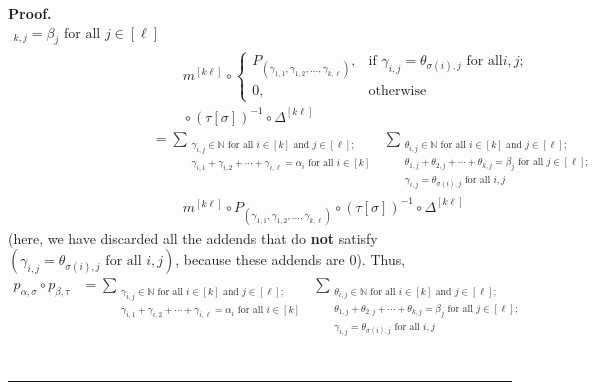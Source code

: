 \documentclass[numbers=enddot,12pt,final,onecolumn,notitlepage]{scrartcl}%
\theoremstyle{definition}
\newenvironment{proof}[1][Proof]{\noindent\textbf{#1.} }{\ \rule{0.5em}{0.5em}}
\let\sumnonlimits\sum
\renewcommand{\sum}{\sumnonlimits\limits}
\begin{document}
\begin{proof}
\begin{align*}
{{_{k,j}=\beta_{j}\text{ for all }j\in\left[  \ell\right]  }}\\
&  \ \ \ \ \ \ \ \ \ \ m^{\left[  k\ell\right]  }\circ%
\begin{cases}
P_{\left(  \gamma_{1,1},\gamma_{1,2},\ldots,\gamma_{k,\ell}\right)  }, &
\text{if }\gamma_{i,j}=\theta_{\sigma\left(  i\right)  ,j}\text{ for all
}i,j;\\
0, & \text{otherwise}%
\end{cases}
\\
&  \ \ \ \ \ \ \ \ \ \ \circ\left(  \tau\left[  \sigma\right]  \right)
^{-1}\circ\Delta^{\left[  k\ell\right]  }\\
&  =\sum_{\substack{\gamma_{i,j}\in\mathbb{N}\text{ for all }i\in\left[
k\right]  \text{ and }j\in\left[  \ell\right]  ;\\\gamma_{i,1}+\gamma
_{i,2}+\cdots+\gamma_{i,\ell}=\alpha_{i}\text{ for all }i\in\left[  k\right]
}}\ \ \sum_{\substack{\theta_{i,j}\in\mathbb{N}\text{ for all }i\in\left[
k\right]  \text{ and }j\in\left[  \ell\right]  ;\\\theta_{1,j}+\theta
_{2,j}+\cdots+\theta_{k,j}=\beta_{j}\text{ for all }j\in\left[  \ell\right]
;\\\gamma_{i,j}=\theta_{\sigma\left(  i\right)  ,j}\text{ for all }i,j}}\\
&  \ \ \ \ \ \ \ \ \ \ m^{\left[  k\ell\right]  }\circ P_{\left(  \gamma
_{1,1},\gamma_{1,2},\ldots,\gamma_{k,\ell}\right)  }\circ\left(  \tau\left[
\sigma\right]  \right)  ^{-1}\circ\Delta^{\left[  k\ell\right]  }%
\end{align*}
(here, we have discarded all the addends that do \textbf{not} satisfy $\left(
\gamma_{i,j}=\theta_{\sigma\left(  i\right)  ,j}\text{ for all }i,j\right)  $,
because these addends are $0$). Thus,%
\begin{align}
p_{\alpha,\sigma}\circ p_{\beta,\tau}  &  =\sum_{\substack{\gamma_{i,j}%
\in\mathbb{N}\text{ for all }i\in\left[  k\right]  \text{ and }j\in\left[
\ell\right]  ;\\\gamma_{i,1}+\gamma_{i,2}+\cdots+\gamma_{i,\ell}=\alpha
_{i}\text{ for all }i\in\left[  k\right]  }}\ \ \sum_{\substack{\theta
_{i,j}\in\mathbb{N}\text{ for all }i\in\left[  k\right]  \text{ and }%
j\in\left[  \ell\right]  ;\\\theta_{1,j}+\theta_{2,j}+\cdots+\theta
_{k,j}=\beta_{j}\text{ for all }j\in\left[  \ell\right]  ;\\\gamma
_{i,j}=\theta_{\sigma\left(  i\right)  ,j}\text{ for all }i,j}}\nonumber\\

\end{align}
\end{proof}
\end{document}
